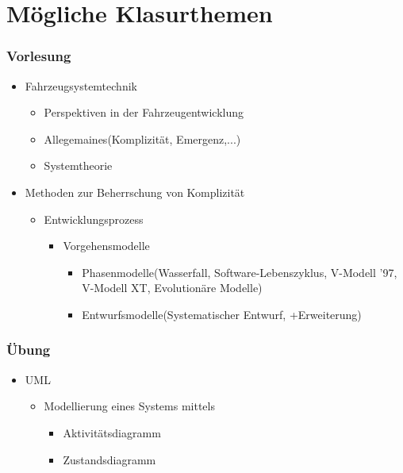 \part{M\"ogliche Klasurthemen}
\section{Vorlesung}
\begin{itemize}
    \item Fahrzeugsystemtechnik\begin{itemize}
              \item Perspektiven in der Fahrzeugentwicklung
              \item Allegemaines(Komplizit\"at, Emergenz,...)
              \item Systemtheorie
          \end{itemize}
    \item Methoden zur Beherrschung von Komplizit\"at\begin{itemize}
              \item Entwicklungsprozess\begin{itemize}
                        \item Vorgehensmodelle\begin{itemize}
                                  \item Phasenmodelle(Wasserfall, Software-Lebenszyklus, V-Modell '97, V-Modell XT, Evolution\"are Modelle)
                                  \item Entwurfsmodelle(Systematischer Entwurf, +Erweiterung)
                              \end{itemize}
                    \end{itemize}
          \end{itemize}
\end{itemize}
\section{\"Ubung}
\begin{itemize}
    \item UML\begin{itemize}
              \item Modellierung eines Systems mittels\begin{itemize}
                        \item Aktivit\"atsdiagramm
                        \item Zustandsdiagramm
                    \end{itemize}
          \end{itemize}
\end{itemize}